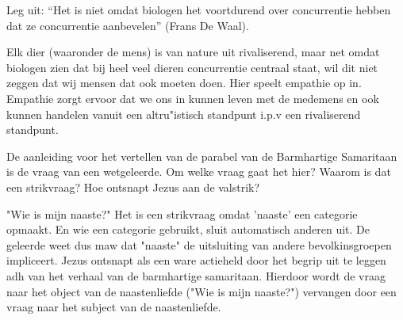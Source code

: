 \documentclass[main.tex]{subfiles}
\begin{document}
\begin{examenvraag}
    \begin{vraag}
        Leg uit: “Het is niet omdat biologen het voortdurend over concurrentie hebben dat ze concurrentie aanbevelen” (Frans De Waal).
    \end{vraag}

    \begin{antwoord}
	    Elk dier (waaronder de mens) is van nature uit rivaliserend, maar net omdat biologen zien dat bij heel veel dieren concurrentie centraal staat, wil dit niet zeggen dat wij mensen dat ook moeten doen. Hier speelt empathie op in. Empathie zorgt ervoor dat we ons in kunnen leven met de medemens en ook kunnen handelen vanuit een altru"istisch standpunt i.p.v een rivaliserend standpunt.
    \end{antwoord}
\end{examenvraag}


\begin{examenvraag}
    \begin{vraag}
        De aanleiding voor het vertellen van de parabel van de Barmhartige Samaritaan is de vraag van een wetgeleerde. Om welke vraag gaat het hier? Waarom is dat een strikvraag? Hoe ontsnapt Jezus aan de valstrik?
    \end{vraag}

    \begin{antwoord}
		"Wie is mijn naaste?" 
		Het is een strikvraag omdat 'naaste' een categorie opmaakt. 
		En wie een categorie gebruikt, sluit automatisch anderen uit.
		De geleerde weet dus maw dat "naaste" de uitsluiting van andere bevolkinsgroepen impliceert.
		Jezus ontsnapt als een ware actieheld door het begrip uit te leggen adh van het verhaal van de barmhartige samaritaan.
		Hierdoor wordt de vraag naar het object van de naastenliefde ("Wie is mijn naaste?")  vervangen door een vraag naar het subject van de naastenliefde.
		
		    
    
    \end{antwoord}
\end{examenvraag}
\end{document}
